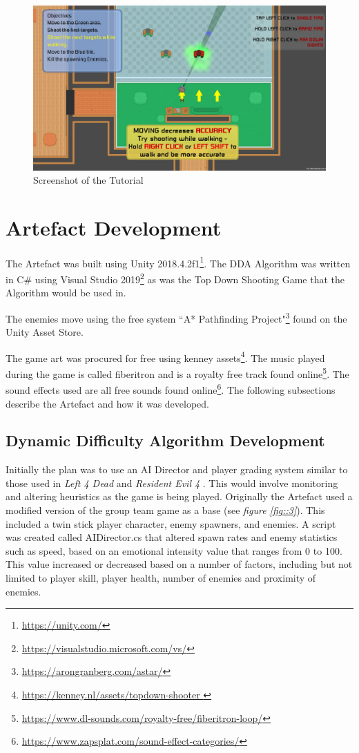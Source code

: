 \documentclass[journal]{IEEEtran}
\begin{document}
\begin{figure}[h]
	\includegraphics[width=1.0\linewidth]{tutorialscreenshot.jpg}
	\caption{Screenshot of the Tutorial}
	\label{fig::4}
\end{figure} 



\section{Artefact Development}

The Artefact was built using Unity 2018.4.2f1\footnote{\url{https://unity.com/}}. The DDA Algorithm was written in C\# using Visual Studio 2019\footnote{\url{https://visualstudio.microsoft.com/vs/}} as was the Top Down Shooting Game that the Algorithm would be used in. 

The enemies move using the free system ``A* Pathfinding Project"\footnote{\url{https://arongranberg.com/astar/}} found on the Unity Asset Store.

The game art was procured for free using kenney assets\footnote{\url{https://kenney.nl/assets/topdown-shooter }}. The music played during the game is called fiberitron and is a royalty free track found online\footnote{\url{https://www.dl-sounds.com/royalty-free/fiberitron-loop/}}. The sound effects used are all free sounds found online\footnote{\url{https://www.zapsplat.com/sound-effect-categories/}}. The following subsections describe the Artefact and how it was developed.


\subsection{Dynamic Difficulty Algorithm Development}


Initially the plan was to use an AI Director and player grading system similar to those used in \textit{Left 4 Dead} \cite{game:left4dead} and \textit{Resident Evil 4} \cite{game:re4}. This would involve monitoring and altering heuristics as the game is being played. Originally the Artefact used a modified version of the group team game as a base (see \textit{figure \ref{fig::3}}). This included a twin stick player character, enemy spawners, and enemies. A script was created called AIDirector.cs that altered spawn rates and enemy statistics such as speed, based on an emotional intensity value that ranges from 0 to 100. This value increased or decreased based on a number of factors, including but not limited to player skill, player health, number of enemies and proximity of enemies. 
\end{document}
